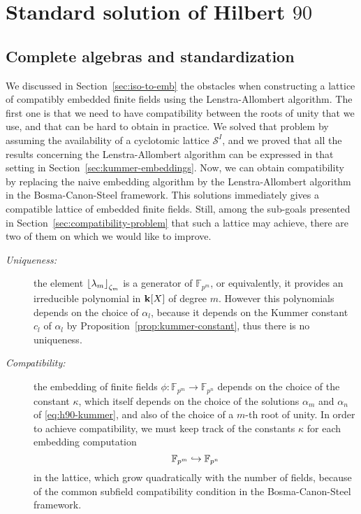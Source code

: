 \section{Standard solution of Hilbert $90$}
\label{sec:standard-solution}

\subsection{Complete algebras and standardization}
\label{sec:standardization}

We discussed in Section~\ref{sec:iso-to-emb} the 
obstacles when constructing a lattice of compatibly embedded finite fields using
the Lenstra-Allombert algorithm. The first one is that we need to have compatibility
between the roots of unity that we use, and that can be hard to obtain in
practice. We solved that problem by assuming the availability of a
cyclotomic lattice $\mathcal S^I$, and we proved that all the results concerning
the Lenstra-Allombert algorithm can be expressed in that setting in
Section~\ref{sec:kummer-embeddings}. Now, we can obtain compatibility by
replacing the naive embedding algorithm by the Lenstra-Allombert algorithm in
the Bosma-Canon-Steel framework. This solutions immediately gives a compatible
lattice of embedded finite fields. Still, among the sub-goals presented in
Section~\ref{sec:compatibility-problem} that such a lattice may achieve, there
are two of them on which we would like to improve.
\begin{description}
  \item[\emph{Uniqueness:}] the element $\left\lfloor \lambda_m \right\rfloor_{\zeta_m}$ is
    a generator of $\mathbb{F}_{p^{m}}$, or equivalently, it provides an
    irreducible polynomial in $\mathbf{k}[X]$ of degree $m$. However this polynomials
    depends on the choice of $\alpha_l$, because it depends on the Kummer constant
    $c_l$ of $\alpha_l$ by Proposition~\ref{prop:kummer-constant}, thus there is
    no uniqueness.
  \item[\emph{Compatibility:}] the embedding of finite fields
    $\phi:\mathbb{F}_{p^{m}}\to\mathbb{F}_{p^{n}}$ depends on
    the choice of the constant $\kappa$, which itself depends on the choice of
    the solutions $\alpha_m$ and $\alpha_n$ of \eqref{eq:h90-kummer}, and also
    of the choice of a $m$-th root of unity. In order to achieve compatibility,
    we must keep track of the constants $\kappa$ for each embedding computation
    \[
      \mathbb{F}_{p^{m}}\hookrightarrow\mathbb{F}_{p^{n}}
    \]
    in the
    lattice, which grow quadratically with the number of fields, because of the
    common subfield compatibility condition in the Bosma-Canon-Steel framework.
\end{description}
